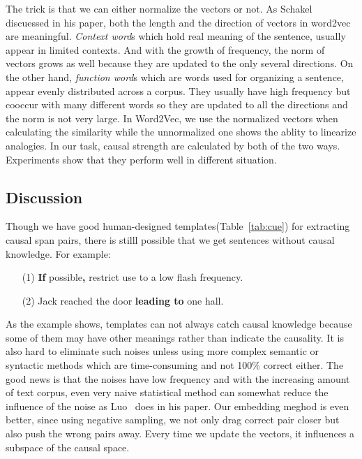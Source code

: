 The trick is that we can either normalize the vectors or not. As Schakel\cite{schakel2015measuring} discuessed in his paper, both the length and the direction of vectors in word2vec are meaningful. \emph{Context word}s which hold real meaning of the sentence, usually appear in limited contexts. And with the growth of frequency, the norm of vectors grows as well because they are updated to the only several directions. On the other hand, \emph{function word}s which are words used for organizing a sentence, appear evenly distributed across a corpus. They usually have high frequency but cooccur with many different words so they are updated to all the directions and the norm is not very large. 
In Word2Vec, we use the normalized vectors when calculating the similarity while the unnormalized one shows the ablity to linearize analogies. In our task, causal strength are calculated by both of the two ways.
Experiments show that they perform well in different situation.

\subsection{Discussion}
Though we have good human-designed templates(Table~\ref{tab:cue}) for extracting causal span pairs, there is stilll possible that we get sentences without causal knowledge. For example: 
\begin{example}
	\noindent
	\begin{itemize}
		\item[(1)] \textbf{If} possible\textbf{,} restrict use to a low flash frequency.
		\item[(2)] Jack reached the door \textbf{leading to} one hall.
	\end{itemize}
\end{example}
As the example shows, templates can not always catch causal knowledge because some of them may have other meanings rather than indicate the causality. It is also hard to eliminate such noises unless using more complex semantic or syntactic methods which are time-consuming and not 100\% correct either.
The good news is that the noises have low frequency and with the increasing amount of text corpus, even very naive statistical method can somewhat reduce the influence of the noise as Luo~\cite{luo2016commonsense} does in his paper.
Our embedding meghod is even better, since using negative sampling, we not only drag correct pair closer but also push the wrong pairs away. Every time we update the vectors, it influences a subspace of the causal space.